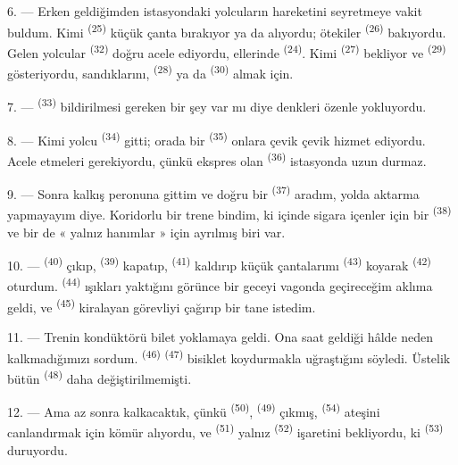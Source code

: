 6. --- Erken geldiğimden istasyondaki yolcuların hareketini seyretmeye vakit
buldum. Kimi  \textsuperscript{(25)} küçük çanta
bırakıyor ya da alıyordu; ötekiler  \textsuperscript{(26)}
bakıyordu. Gelen yolcular  \textsuperscript{(32)} doğru acele
ediyordu, ellerinde  \textsuperscript{(24)}. Kimi
 \textsuperscript{(27)} bekliyor ve
 \textsuperscript{(29)} gösteriyordu, sandıklarını,
 \textsuperscript{(28)} ya da 
\textsuperscript{(30)} almak için.

7. ---  \textsuperscript{(33)} bildirilmesi gereken
bir şey var mı diye denkleri özenle yokluyordu.

8. --- Kimi yolcu  \textsuperscript{(34)} gitti; orada bir
 \textsuperscript{(35)} onlara çevik çevik hizmet ediyordu.
Acele etmeleri gerekiyordu, çünkü ekspres olan 
\textsuperscript{(36)} istasyonda uzun durmaz.

9. --- Sonra kalkış peronuna gittim ve doğru bir 
\textsuperscript{(37)} aradım, yolda aktarma yapmayayım diye. Koridorlu bir
trene bindim, ki içinde sigara içenler için bir 
\textsuperscript{(38)} ve bir de « yalnız hanımlar » için ayrılmış biri var.

\VUsaut{3.0mm}

10. ---  \textsuperscript{(40)} çıkıp, 
\textsuperscript{(39)} kapatıp,  \textsuperscript{(41)}
kaldırıp küçük çantalarımı  \textsuperscript{(43)}
koyarak  \textsuperscript{(42)} oturdum. 
\textsuperscript{(44)} ışıkları yaktığını görünce bir geceyi vagonda
geçireceğim aklıma geldi, ve  \textsuperscript{(45)} kiralayan
görevliyi çağırıp bir tane istedim.

11. --- Trenin kondüktörü bilet yoklamaya geldi. Ona saat geldiği hâlde neden
kalkmadığımızı sordum.  \textsuperscript{(46)}
 \textsuperscript{(47)} bisiklet koydurmakla uğraştığını
söyledi. Üstelik bütün  \textsuperscript{(48)}
daha değiştirilmemişti.

12. --- Ama az sonra kalkacaktık, çünkü 
\textsuperscript{(50)},  \textsuperscript{(49)} çıkmış,
 \textsuperscript{(54)} ateşini canlandırmak için kömür
alıyordu, ve  \textsuperscript{(51)} yalnız  \textsuperscript{(52)}
işaretini bekliyordu, ki  \textsuperscript{(53)}
duruyordu.


